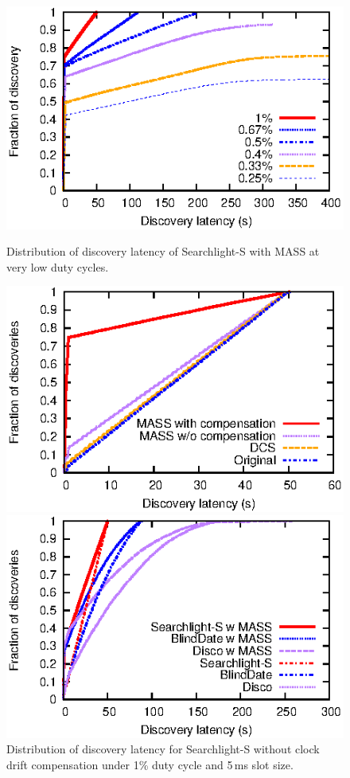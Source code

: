 \documentclass[twoside,twocolumn]{article}
\begin{document}
\begin{figure}[t]
   \centering
   \vspace{0pt}
   \includegraphics[scale=0.85]{graphs/one-month-result/august-low-syn}
   \caption{Distribution of discovery latency of Searchlight-S with
      MASS at very low duty cycles.}
   \label{fig:small}
   \endminipage\hfill
   \centering
   \vspace{0pt} 
   \includegraphics[scale=0.85]{graphs/one-month-result/august-5ms-1-anc-searchlight-strip}
   \caption{Distribution of discovery latency for Searchlight-S
        without clock drift compensation under 1\% duty cycle and 5\,ms
        slot size.}
   \label{fig:a_nc_break-5ms-1-searchlight}
   \endminipage\hfill
   \centering
   \vspace{0pt} %
   \includegraphics[scale=0.85]{graphs/one-month-result/august-random-5ms-1}

\end{figure}
\end{document}
